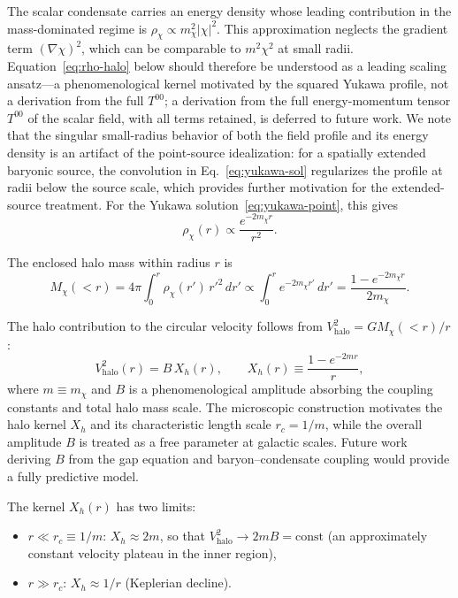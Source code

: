 \documentclass[11pt,a4paper]{article}
\begin{document}
The scalar condensate carries an energy density whose leading
contribution in the mass-dominated regime is
$\rho_\chi \propto m_\chi^2 |\chi|^2$.
This approximation neglects the gradient term
$(\nabla\chi)^2$, which can be comparable to $m^2\chi^2$
at small radii.
Equation~\eqref{eq:rho-halo} below should therefore be understood
as a leading scaling ansatz---a phenomenological kernel motivated
by the squared Yukawa profile, not a derivation from the full
$T^{00}$;
a derivation from the full energy-momentum tensor $T^{00}$
of the scalar field, with all terms retained, is deferred to
future work.
We note that the singular small-radius behavior of both the
field profile and its energy density is an artifact of the
point-source idealization: for a spatially extended baryonic
source, the convolution in Eq.~\eqref{eq:yukawa-sol} regularizes
the profile at radii below the source scale, which provides
further motivation for the extended-source treatment.
For the Yukawa solution~\eqref{eq:yukawa-point}, this gives
\begin{equation}
\rho_\chi(r) \propto
\frac{e^{-2m_\chi r}}{r^2}.
\label{eq:rho-halo}
\end{equation}

The enclosed halo mass within radius $r$ is
\begin{equation}
M_\chi(<r) = 4\pi\int_0^r \rho_\chi(r')\,r'^2\,dr'
\propto \int_0^r e^{-2m_\chi r'}\,dr'
= \frac{1 - e^{-2m_\chi r}}{2m_\chi}.
\label{eq:M-enclosed}
\end{equation}

The halo contribution to the circular velocity follows from
$V_{\mathrm{halo}}^2 = GM_\chi(<r)/r$:
\begin{equation}
V_{\mathrm{halo}}^2(r) = B\,X_h(r),
\qquad
X_h(r) \equiv \frac{1 - e^{-2m r}}{r},
\label{eq:Vhalo}
\end{equation}
where $m \equiv m_\chi$ and $B$ is a phenomenological amplitude
absorbing the coupling constants and total halo mass scale.
The microscopic construction motivates the halo kernel $X_h$ and
its characteristic length scale $r_c = 1/m$, while the overall
amplitude $B$ is treated as a free parameter at galactic scales.
Future work deriving $B$ from the gap equation and baryon--condensate
coupling would provide a fully predictive model.

The kernel $X_h(r)$ has two limits:
\begin{itemize}
\item $r \ll r_c \equiv 1/m$:\;
  $X_h \approx 2m$, so that
  $V_{\mathrm{halo}}^2 \to 2mB = \mathrm{const}$
  (an approximately constant velocity plateau in the inner region),
\item $r \gg r_c$:\;
  $X_h \approx 1/r$ (Keplerian decline).
\end{itemize}
\end{document}
